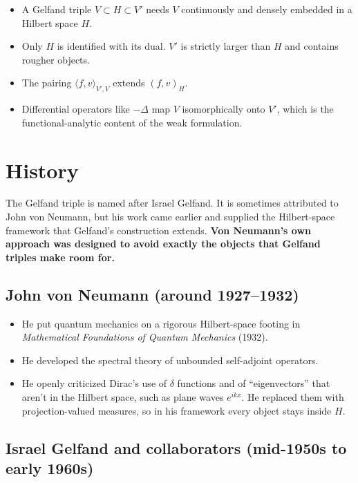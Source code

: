 \documentclass[11pt]{article}
\newcommand{\pair}[2]{\langle #1, #2 \rangle}
\newcommand{\ip}[2]{( #1, #2 )}
\newcommand{\lap}{\Delta}
\theoremstyle{definition}
\theoremstyle{plain}
\begin{document}
\begin{itemize}
  \item A Gelfand triple $V\subset H\subset V'$ needs $V$ continuously and
    densely embedded in a Hilbert space $H$.
  \item Only $H$ is identified with its dual. $V'$ is strictly larger than $H$
    and contains rougher objects.
  \item The pairing $\pair{f}{v}_{V',V}$ extends $\ip{f}{v}_H$.
  \item Differential operators like $-\lap$ map $V$ isomorphically onto $V'$,
    which is the functional-analytic content of the weak formulation.
\end{itemize}

\appendix

\section{History}

The Gelfand triple is named after Israel Gelfand. It is sometimes attributed to
John von Neumann, but his work came earlier and supplied the Hilbert-space
framework that Gelfand's construction extends. \textbf{Von Neumann's own approach
was designed to avoid exactly the objects that Gelfand triples make room for.}

\subsection*{John von Neumann (around 1927--1932)}

\begin{itemize}
  \item He put quantum mechanics on a rigorous Hilbert-space footing in
    \emph{Mathematical Foundations of Quantum Mechanics} (1932).
  \item He developed the spectral theory of unbounded self-adjoint operators.
  \item He openly criticized Dirac's use of $\delta$ functions and of
    ``eigenvectors'' that aren't in the Hilbert space, such as plane waves
    $e^{ikx}$. He replaced them with projection-valued measures, so in his
    framework every object stays inside $H$.
\end{itemize}

\subsection*{Israel Gelfand and collaborators (mid-1950s to early 1960s)}
\end{document}

